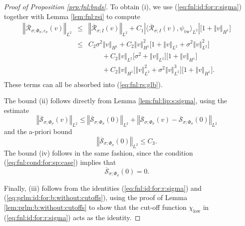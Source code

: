 \documentclass[10pt]{articleHJ}
\newcommand{\abs}[1]{\left\vert#1\right\vert}			%
\newcommand{\norm}[1]{\left\Vert#1\right\Vert}		%
\newcommand{\sref}[1]{(\ref{#1})}                       %
\numberwithin{equation}{section}
\begin{document}
\begin{proof}[
Proof of Proposition \ref{prp:fnl:bnds}]
To obtain (i),
we use \sref{eq:fnl:id:for:r:sigma}
together with
Lemma \ref{lem:fnl:rsi}
to compute
\begin{equation}
\begin{array}{lcl}
\norm{\overline{\mathcal{R}}_{\sigma;\Phi_{\sigma}, c_{\sigma}}(v)}_{L^2}
& \le &
\norm{\overline{\mathcal{R}}_{\sigma;I}(v)}_{L^2}
+ C_1 \abs{
  \langle \overline{\mathcal{R}}_{\sigma;I}(v),
    \psi_{\mathrm{tw}} \rangle_{L^2} }
    \big[ 1 + \norm{v}_{H^1} \big]
\\[0.2cm]
& \le &
C_2 \sigma^2 \norm{v}_{H^1}
+ C_2 \norm{v}_{H^1}^2
  \big[
    1 + \norm{v}_{L^2} + \sigma^2 \norm{v}_{L^2}^2
  \big]
\\[0.2cm]
& & \qquad
+C_2 \norm{v}_{L^2} \big[ \sigma^2 + \norm{v}_{L^2} \big]
    \big[ 1 + \norm{v}_{H^1} \big]
\\[0.2cm]
& & \qquad
+ C_2 \norm{v}_{H^1}
  \big[
     \norm{v}_{L^2}^2 + \sigma^2 \norm{v}_{L^2}^3
  \big]
     \big[ 1 + \norm{v}_{H^1} \big].
\\[0.2cm]
\end{array}
\end{equation}
These terms can all be absorbed into
\sref{eq:fnl:rs:glb}.

The bound (ii) follows directly
from Lemma \ref{lem:fnl:lip:s:sigma},
using the estimate
\begin{equation}
\norm{
  \overline{\mathcal{S}}_{\sigma;\Phi_{\sigma}}(v)
}_{L^2}
\le
 \norm{
   \overline{\mathcal{S}}_{\sigma;\Phi_{\sigma}}(0)
 }_{L^2}
 + \norm{
   \overline{\mathcal{S}}_{\sigma;\Phi_{\sigma}}(v)
  -
  \overline{\mathcal{S}}_{\sigma;\Phi_{\sigma}}(0)
 }_{L^2}
\end{equation}
and the a-priori bound
\begin{equation}
\norm{\overline{\mathcal{S}}_{\sigma;\Phi_{\sigma}}
  ( 0 ) }_{L^2}
\le C_3.
\end{equation}
The bound (iv) follows in the same fashion,
since
the condition
 \sref{eq:fnl:cond:for:sp:case}
implies that
\begin{equation}
\overline{\mathcal{S}}_{\sigma;\Phi_{\sigma}}(0)
  = 0 .
\end{equation}

Finally, (iii) follows from
the identities
\sref{eq:fnl:id:for:r:sigma}
and \sref{eq:prlm:id:for:b:without:cutoffs},
using the proof of
Lemma \ref{lem:prlm:b:without:cutoffs}
to show that the cut-off function
$\chi_{\mathrm{low}}$
in \sref{eq:fnl:id:for:r:sigma} acts
as the identity.
\end{proof}
\end{document}
